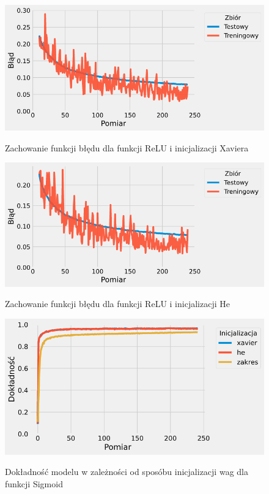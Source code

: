 \documentclass{article}
\begin{document}
\begin{figure}[H]
	\centering
	\caption{Zachowanie funkcji błędu dla funkcji ReLU i inicjalizacji Xaviera}
	\includegraphics[width=\textwidth]{relu_init_xav.png}
	\label{fig:res204}
\end{figure}
\begin{figure}[H]
	\centering
	\caption{Zachowanie funkcji błędu dla funkcji ReLU i inicjalizacji He}
	\includegraphics[width=\textwidth]{relu_init_he.png}
	\label{fig:res205}
\end{figure}
\begin{figure}[H]
	\centering
	\caption{Dokładność modelu w zależności od sposóbu inicjalizacji wag dla funkcji Sigmoid}
	\includegraphics[width=\textwidth]{sig_init_acc.png}
	\label{fig:res206}
\end{figure}
\end{document}
